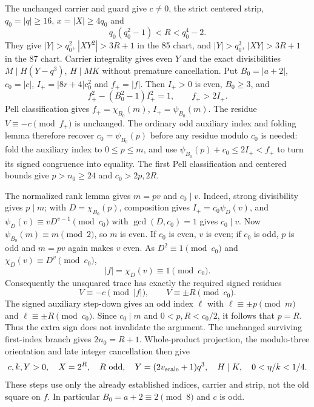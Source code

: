 The unchanged carrier and guard give $c\ne0$, the strict centered strip,
$q_0=|q|\ge16$, $x=|X|\ge4q_0$ and
\[
 q_0(q_0^2-1)<R<q_0^4-2.
\]
They give $|Y|>q_0^2$, $|XY^2|>3R+1$ in the 85 chart, and $|Y|>q_0^3$,
$|XY|>3R+1$ in the 87 chart. Carrier integrality gives even $Y$ and the exact
divisibilities $M\mid H(Y-q^3)$, $H\mid MK$ without premature cancellation.
Put $B_0=|a+2|$, $c_0=|c|$, $I_+=|8r+4|c_0^2$ and $f_+=|f|$.
Then $I_+>0$ is even, $B_0\ge3$, and
\[
 f_+^2-(B_0^2-1)I_+^2=1,\qquad f_+>2I_+.
\]
Pell classification gives $f_+=\chi_{B_0}(m)$, $I_+=\psi_{B_0}(m)$.
The residue $V\equiv-c\pmod {f_+}$ is unchanged. The ordinary odd auxiliary
index and folding lemma therefore recover $c_0=\psi_{B_0}(p)$ before any
residue modulo $c_0$ is needed: fold the auxiliary index to $0\le p\le m$,
and use $\psi_{B_0}(p)+c_0\le2I_+<f_+$ to turn its signed congruence into
equality. The first Pell classification and centered bounds give $p>n_0\ge24$
and $c_0>2p,2R$.

The normalized rank lemma gives $m=pv$ and $c_0\mid v$. Indeed, strong
divisibility gives $p\mid m$; with $D=\chi_{B_0}(p)$, composition gives
$I_+=c_0\psi_D(v)$, and
$\psi_D(v)\equiv vD^{v-1}\pmod {c_0}$ with $\gcd(D,c_0)=1$ gives $c_0\mid v$.
Now $\psi_{B_0}(m)\equiv m\pmod2$, so $m$ is even. If $c_0$ is even,
$v$ is even; if $c_0$ is odd, $p$ is odd and $m=pv$ again makes $v$ even.
As $D^2\equiv1\pmod {c_0}$ and $\chi_D(v)\equiv D^v\pmod {c_0}$,
\[
 |f|=\chi_D(v)\equiv1\pmod {c_0}.
\]
Consequently the unsquared trace has exactly the required signed residues
\[
 V\equiv-c\pmod {|f|},\qquad V\equiv\pm R\pmod {c_0}.
\]
The signed auxiliary step-down gives an odd index $\ell$ with
$\ell\equiv\pm p\pmod m$ and $\ell\equiv\pm R\pmod {c_0}$.
Since $c_0\mid m$ and $0<p,R<c_0/2$, it follows that $p=R$.
Thus the extra sign does not invalidate the argument. The unchanged surviving
first-index branch gives $2n_0=R+1$. Whole-product projection, the modulo-three
orientation and late integer cancellation then give
\[
 c,k,Y>0,\quad X=2^R,\quad R\ \text{odd},\quad
 Y=(2v_{\rm scale}+1)q^3,\quad H\mid K,\quad0<\eta/k<1/4.
\]
These steps use only the already established indices, carrier and strip, not the
old square on $f$. In particular $B_0=a+2\equiv2\pmod8$ and $c$ is odd.

